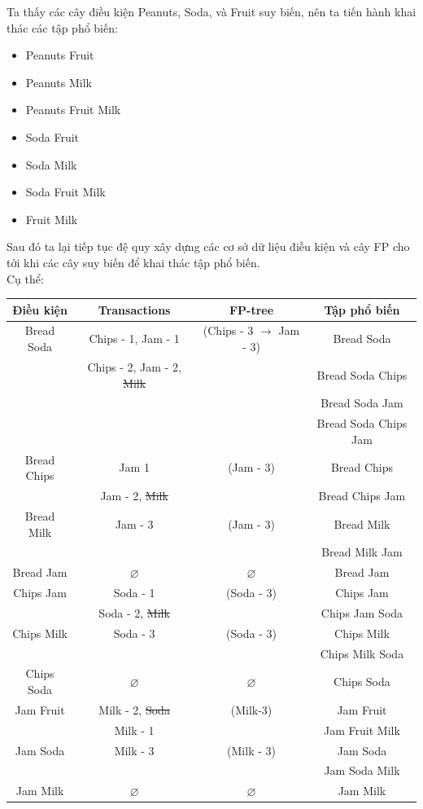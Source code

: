 \documentclass{article}
\begin{document}
\begin{flushleft}
Ta thấy các cây điều kiện Peanuts, Soda, và Fruit suy biến, nên ta tiến hành khai thác các tập phổ biến:
\begin{multicols}{3}
\begin{itemize}
	\item Peanuts Fruit
	\item Peanuts Milk
	\item Peanuts Fruit Milk
	\item Soda Fruit
	\item Soda Milk
	\item Soda Fruit Milk
	\item Fruit Milk
\end{itemize}
\end{multicols}
Sau đó ta lại tiếp tục đệ quy xây dựng các cơ sở dữ liệu điều kiện và cây FP cho tới khi các cây suy biến để khai thác tập phổ biến.\\
Cụ thể:\\
\begin{center}
\begin{tabular}{|c|c|c|c|}
	\hline
	Điều kiện & Transactions & FP-tree & Tập phổ biến \\ 
	\hline
	Bread Soda & Chips - 1, Jam - 1 & (Chips - 3 $\to$ Jam - 3) & Bread Soda \\ 
	& Chips - 2, Jam - 2, \st{Milk} &  & Bread Soda Chips \\ 
	&  &  &  Bread Soda Jam\\
	&  &  &  Bread Soda Chips Jam\\ 
	\hline
	Bread Chips & Jam 1 & (Jam - 3) &Bread Chips\\
	& Jam - 2, \st{Milk} &  & Bread Chips Jam\\
	\hline
	Bread Milk & Jam - 3 & (Jam - 3)& Bread Milk\\
	&  &  &  Bread Milk Jam\\
	\hline
	Bread Jam & $\varnothing$ & $\varnothing$ &Bread Jam\\   
	\hline
	Chips Jam & Soda - 1 & (Soda - 3) & Chips Jam\\
	& Soda - 2, \st{Milk} &  & Chips Jam Soda\\
	\hline
	Chips Milk & Soda - 3 & (Soda - 3) & Chips Milk\\
	&  &  & Chips Milk Soda\\
	\hline
	Chips Soda & $\varnothing$ & $\varnothing$ & Chips Soda\\
	\hline
	Jam Fruit & Milk - 2, \st{Soda} & (Milk-3) & Jam Fruit\\
	& Milk - 1 &  & Jam Fruit Milk\\
	\hline
	Jam Soda & Milk - 3 & (Milk - 3) & Jam Soda \\
	&  &  & Jam Soda Milk\\
	\hline 
	Jam Milk & $\varnothing$ & $\varnothing$ & Jam Milk\\
	\hline
\end{tabular} 
\end{center}

\end{flushleft}
\end{document}
